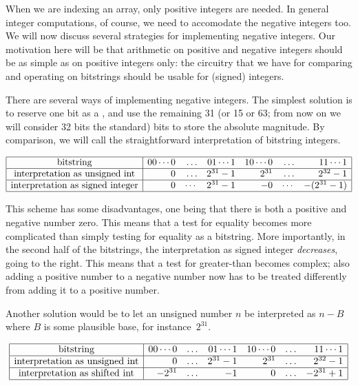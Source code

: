 When we are indexing an array, only positive integers are needed.
In general integer computations, of course, we need to accomodate
the negative integers too. We will now discuss several strategies for
implementing negative integers. Our motivation here will be that
arithmetic on positive and negative integers should be as simple as on
positive integers only: the circuitry that we have for comparing and
operating on bitstrings should be usable for (signed) integers.

There are several ways of implementing
negative integers. The simplest solution is to reserve one bit as a
, and use the remaining 31 (or 15 or 63; from now on we will
consider 32 bits the standard) bits to store the
absolute magnitude. By comparison, we will call the straightforward
interpretation of bitstring  integers.

\[
\begin{array}{|c|rrrrrr|}
  \hline
  \hbox{bitstring}&
  00\cdots0&\ldots&01\cdots1&
  10\cdots0&\ldots&11\cdots1\\ \hline
  \hbox{interpretation as unsigned int}&
  0&\ldots&2^{31}-1&
  2^{31}&\ldots&2^{32}-1\\ \hline
  \hbox{interpretation as signed integer}&
  0&\cdots&2^{31}-1&
  -0&\cdots&-(2^{31}-1)\\
  \hline
\end{array}
\]

This scheme has some disadvantages, one being that
there is both a positive and negative number zero. This means that a test
for equality becomes more complicated than simply testing for equality
as a bitstring. More importantly, in the second half of the
bitstrings, the interpretation as signed integer \emph{decreases},
going to the right. This means that a test for greater-than becomes
complex; also
adding a positive number to a
negative number now has to be treated differently from adding it to a
positive number.

Another solution would be to let an unsigned number $n$ be interpreted
as $n-B$ where $B$ is some plausible base, for instance~$2^{31}$.

\[
\begin{array}{|c|rrrrrr|}
  \hline
  \hbox{bitstring}&
  00\cdots0&\ldots&01\cdots1&
  10\cdots0&\ldots&11\cdots1\\ \hline
  \hbox{interpretation as unsigned int}&
  0&\ldots&2^{31}-1&
  2^{31}&\ldots&2^{32}-1\\ \hline
  \hbox{interpretation as shifted int}&
  -2^{31}&\ldots&-1&
  0&\ldots&-2^{31}+1\\ \hline
\end{array}
\]

